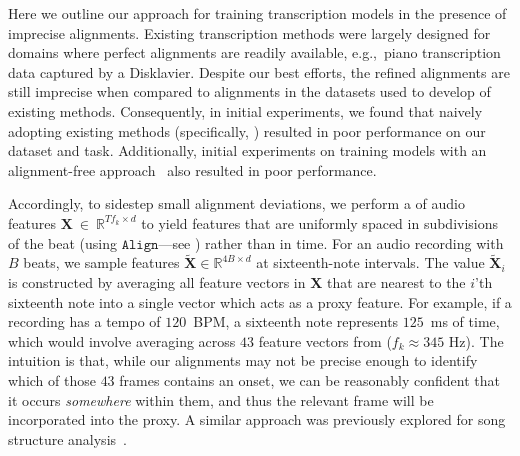Here we outline our approach for training transcription models in the presence of imprecise alignments. 
Existing transcription methods were largely designed for domains where perfect alignments are readily available, e.g.,~piano transcription data captured by a Disklavier. 
Despite our best efforts, the refined \hooktheory{} alignments are still imprecise when compared to alignments in the datasets used to develop of existing methods. 
Consequently, in initial experiments, we found that naively adopting existing methods (specifically, \cite{hawthorne2017onsets,hawthorne2021sequence}) resulted in poor performance on our dataset and task. 
Additionally, initial experiments on training models with an alignment-free approach~\cite{graves2006connectionist} also resulted in poor performance.

Accordingly, to sidestep small alignment deviations, we perform a \beatpooling{} of audio features $\bm{X}~\in~\mathbb{R}^{Tf_k \times d}$ to yield features that are uniformly spaced in subdivisions of the beat (using $\texttt{Align}$---see ) rather than in time. 
For an audio recording with $B$ beats, we sample features $\tilde{\bm{X}} \in \mathbb{R}^{4B \times d}$ at sixteenth-note intervals. 
The value $\tilde{\bm{X}}_i$ is constructed by averaging all feature vectors in $\bm{X}$ that are nearest to the $i$'th sixteenth note into a single vector which acts as a proxy feature. 
For example, if a recording has a tempo of $120$~BPM, a sixteenth note represents $125$~ms of time, which would involve averaging across 
$43$ feature vectors from \jukebox{} (${f_k \approx 345}$ Hz). 
The intuition is that, while our alignments may not be precise enough to identify which of those $43$ frames contains an onset, we can be reasonably confident that it occurs \emph{somewhere} within them, and thus the relevant frame will be incorporated into the proxy. 
A similar approach was previously explored for song structure analysis~\cite{mcfee2014analyzing}.%


